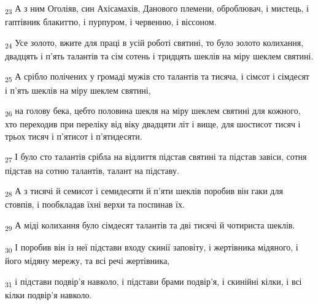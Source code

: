 \begin{tcolorbox}
\textsubscript{23} А з ним Оголіяв, син Ахісамахів, Данового племени, оброблювач, і мистець, і гаптівник блакиттю, і пурпуром, і червенню, і віссоном.
\end{tcolorbox}
\begin{tcolorbox}
\textsubscript{24} Усе золото, вжите для праці в усій роботі святині, то було золото колихання, двадцять і п'ять талантів та сім сотень і тридцять шеклів на міру шеклем святині.
\end{tcolorbox}
\begin{tcolorbox}
\textsubscript{25} А срібло полічених у громаді мужів сто талантів та тисяча, і сімсот і сімдесят і п'ять шеклів на міру шеклем святині,
\end{tcolorbox}
\begin{tcolorbox}
\textsubscript{26} на голову бека, цебто половина шекля на міру шеклем святині для кожного, хто переходив при переліку від віку двадцяти літ і вище, для шостисот тисяч і трьох тисяч і п'ятисот і п'ятидесяти.
\end{tcolorbox}
\begin{tcolorbox}
\textsubscript{27} І було сто талантів срібла на відлиття підстав святині та підстав завіси, сотня підстав на сотню талантів, талант на підставу.
\end{tcolorbox}
\begin{tcolorbox}
\textsubscript{28} А з тисячі й семисот і семидесяти й п'яти шеклів поробив він гаки для стовпів, і пообкладав їхні верхи та поспинав їх.
\end{tcolorbox}
\begin{tcolorbox}
\textsubscript{29} А міді колихання було сімдесят талантів та дві тисячі й чотириста шеклів.
\end{tcolorbox}
\begin{tcolorbox}
\textsubscript{30} І поробив він із неї підстави входу скинії заповіту, і жертівника мідяного, і його мідяну мережу, та всі речі жертівника,
\end{tcolorbox}
\begin{tcolorbox}
\textsubscript{31} і підстави подвір'я навколо, і підстави брами подвір'я, і скинійні кілки, і всі кілки подвір'я навколо.
\end{tcolorbox}
